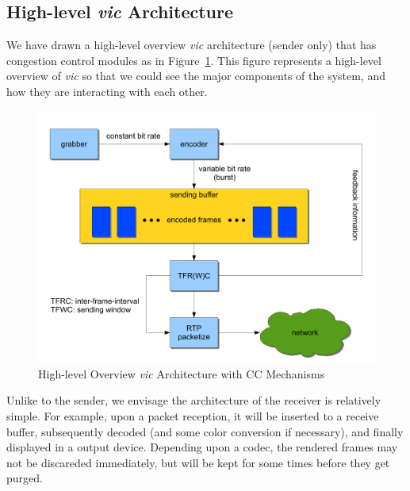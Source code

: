 
\subsection{\label{ssec:high-arch}High-level \emph{vic} Architecture}

We have drawn a high-level overview \emph{vic} architecture (sender only) that
has congestion control modules as in Figure~\ref{fig:high-arch}. This figure
represents a high-level overview of \emph{vic} so that we could see the major
components of the system, and how they are interacting with each other. 

\vspace{1cm}

\begin{figure}[!h]
\begin{center}
\includegraphics[scale=.5]{./img/high-vic-arch}
\caption{\label{fig:high-arch}High-level Overview \emph{vic} Architecture 
with CC Mechanisms}
\end{center}
\end{figure}

Unlike to the sender, we envisage the architecture of the receiver is relatively
simple. For example, upon a packet reception, it will be inserted to a receive
buffer, subsequently decoded (and some color conversion if necessary), and
finally displayed in a output device. Depending upon a codec, the rendered
frames may not be discareded immediately, but will be kept for some times before
they get purged.

\newpage
